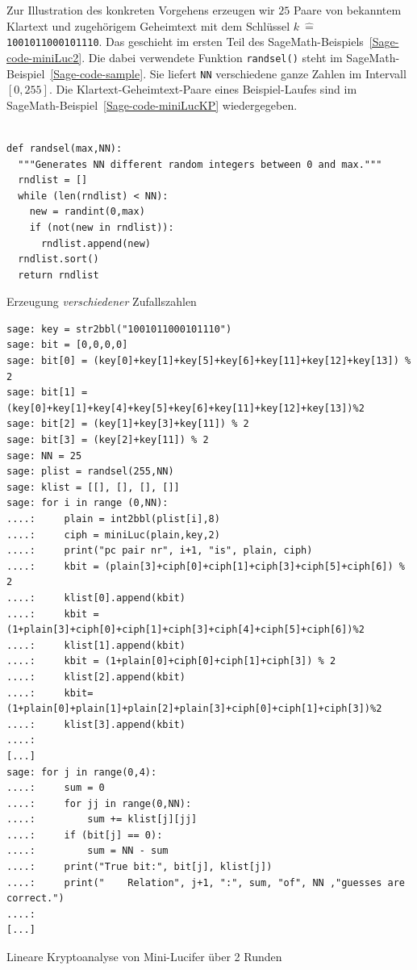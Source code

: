 \begin{refsegment}
Zur Illustration des konkreten Vorgehens erzeugen wir $25$ Paare von
bekanntem Klartext und zugehörigem Geheimtext mit dem Schlüssel
$k \:\hat{=}\:$ \verb:1001011000101110:. Das geschieht im ersten
Teil des SageMath-Beispiels~\ref{Sage-code-miniLuc2}. Die dabei verwendete
Funktion \verb:randsel(): steht im SageMath-Beispiel~\ref{Sage-code-sample}.
Sie liefert \verb:NN: verschiedene ganze Zahlen
im Intervall $[0,255]$. Die Klartext-Geheimtext-Paare eines
Beispiel-Laufes sind im SageMath-Beispiel~\ref{Sage-code-miniLucKP}
wiedergegeben.

\begin{sagecode}
\begin{verbatim}

def randsel(max,NN):
  """Generates NN different random integers between 0 and max."""
  rndlist = []
  while (len(rndlist) < NN):
    new = randint(0,max)
    if (not(new in rndlist)):
      rndlist.append(new)
  rndlist.sort()
  return rndlist
\end{verbatim}
\caption{Erzeugung {\em verschiedener} Zufallszahlen}\label{Sage-code-sample}
\end{sagecode}


\begin{sagecode}
{\small
\begin{verbatim}
sage: key = str2bbl("1001011000101110")
sage: bit = [0,0,0,0]
sage: bit[0] = (key[0]+key[1]+key[5]+key[6]+key[11]+key[12]+key[13]) % 2
sage: bit[1] = (key[0]+key[1]+key[4]+key[5]+key[6]+key[11]+key[12]+key[13])%2
sage: bit[2] = (key[1]+key[3]+key[11]) % 2
sage: bit[3] = (key[2]+key[11]) % 2
sage: NN = 25
sage: plist = randsel(255,NN)
sage: klist = [[], [], [], []]
sage: for i in range (0,NN):
....:     plain = int2bbl(plist[i],8)
....:     ciph = miniLuc(plain,key,2)
....:     print("pc pair nr", i+1, "is", plain, ciph)
....:     kbit = (plain[3]+ciph[0]+ciph[1]+ciph[3]+ciph[5]+ciph[6]) % 2
....:     klist[0].append(kbit)
....:     kbit = (1+plain[3]+ciph[0]+ciph[1]+ciph[3]+ciph[4]+ciph[5]+ciph[6])%2
....:     klist[1].append(kbit)
....:     kbit = (1+plain[0]+ciph[0]+ciph[1]+ciph[3]) % 2
....:     klist[2].append(kbit)
....:     kbit=(1+plain[0]+plain[1]+plain[2]+plain[3]+ciph[0]+ciph[1]+ciph[3])%2
....:     klist[3].append(kbit)
....:
[...]
sage: for j in range(0,4):
....:     sum = 0
....:     for jj in range(0,NN):
....:         sum += klist[j][jj]
....:     if (bit[j] == 0):
....:         sum = NN - sum
....:     print("True bit:", bit[j], klist[j])
....:     print("    Relation", j+1, ":", sum, "of", NN ,"guesses are correct.")
....:
[...]
\end{verbatim}
}
\caption{Lineare Kryptoanalyse von Mini-Lucifer über 2 Runden}\label{Sage-code-miniLuc2}
\end{sagecode}



\end{refsegment}
